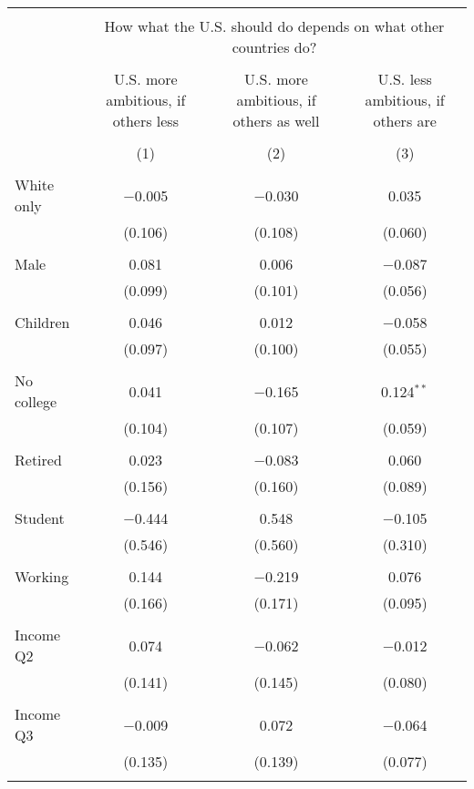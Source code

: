 
\begin{tabular}{@{\extracolsep{5pt}}lccc} 
\\[-1.8ex]\hline 
\hline \\[-1.8ex] 
 & \multicolumn{3}{c}{How what the U.S. should do depends on what other countries do?} \\ 
\cline{2-4} 
\\[-1.8ex] & U.S. more ambitious, if others less & U.S. more ambitious, if others as well & U.S. less ambitious, if others are \\ 
\\[-1.8ex] & (1) & (2) & (3)\\ 
\hline \\[-1.8ex] 
 White only & $-$0.005 & $-$0.030 & 0.035 \\ 
  & (0.106) & (0.108) & (0.060) \\ 
  & & & \\ 
 Male & 0.081 & 0.006 & $-$0.087 \\ 
  & (0.099) & (0.101) & (0.056) \\ 
  & & & \\ 
 Children & 0.046 & 0.012 & $-$0.058 \\ 
  & (0.097) & (0.100) & (0.055) \\ 
  & & & \\ 
 No college & 0.041 & $-$0.165 & 0.124$^{**}$ \\ 
  & (0.104) & (0.107) & (0.059) \\ 
  & & & \\ 
 Retired & 0.023 & $-$0.083 & 0.060 \\ 
  & (0.156) & (0.160) & (0.089) \\ 
  & & & \\ 
 Student & $-$0.444 & 0.548 & $-$0.105 \\ 
  & (0.546) & (0.560) & (0.310) \\ 
  & & & \\ 
 Working & 0.144 & $-$0.219 & 0.076 \\ 
  & (0.166) & (0.171) & (0.095) \\ 
  & & & \\ 
 Income Q2 & 0.074 & $-$0.062 & $-$0.012 \\ 
  & (0.141) & (0.145) & (0.080) \\ 
  & & & \\ 
 Income Q3 & $-$0.009 & 0.072 & $-$0.064 \\ 
  & (0.135) & (0.139) & (0.077) \\ 
  & & & \\ 

\end{tabular}
